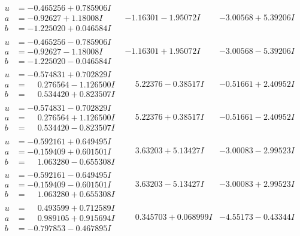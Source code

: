 \documentclass[1p]{elsarticle_modified}
\theoremstyle{definition}
\begin{document}
$$\begin{array}{c|c|c}
\begin{aligned}
u &= -0.465256 + 0.785906 I \\
a &= -0.92627 + 1.18008 I \\
b &= -1.225020 + 0.046584 I\end{aligned}
 & -1.16301 - 1.95072 I & -3.00568 + 5.39206 I \\ \hline\begin{aligned}
u &= -0.465256 - 0.785906 I \\
a &= -0.92627 - 1.18008 I \\
b &= -1.225020 - 0.046584 I\end{aligned}
 & -1.16301 + 1.95072 I & -3.00568 - 5.39206 I \\ \hline\begin{aligned}
u &= -0.574831 + 0.702829 I \\
a &= \phantom{-}0.276564 - 1.126500 I \\
b &= \phantom{-}0.534420 + 0.823507 I\end{aligned}
 & \phantom{-}5.22376 - 0.38517 I & -0.51661 + 2.40952 I \\ \hline\begin{aligned}
u &= -0.574831 - 0.702829 I \\
a &= \phantom{-}0.276564 + 1.126500 I \\
b &= \phantom{-}0.534420 - 0.823507 I\end{aligned}
 & \phantom{-}5.22376 + 0.38517 I & -0.51661 - 2.40952 I \\ \hline\begin{aligned}
u &= -0.592161 + 0.649495 I \\
a &= -0.159409 + 0.601501 I \\
b &= \phantom{-}1.063280 - 0.655308 I\end{aligned}
 & \phantom{-}3.63203 + 5.13427 I & -3.00083 - 2.99523 I \\ \hline\begin{aligned}
u &= -0.592161 - 0.649495 I \\
a &= -0.159409 - 0.601501 I \\
b &= \phantom{-}1.063280 + 0.655308 I\end{aligned}
 & \phantom{-}3.63203 - 5.13427 I & -3.00083 + 2.99523 I \\ \hline\begin{aligned}
u &= \phantom{-}0.493599 + 0.712589 I \\
a &= \phantom{-}0.989105 + 0.915694 I \\
b &= -0.797853 - 0.467895 I\end{aligned}
 & \phantom{-}0.345703 + 0.068999 I & -4.55173 - 0.43344 I \\ \hline\begin{aligned}

\end{aligned}
\end{array}$$
\end{document}
